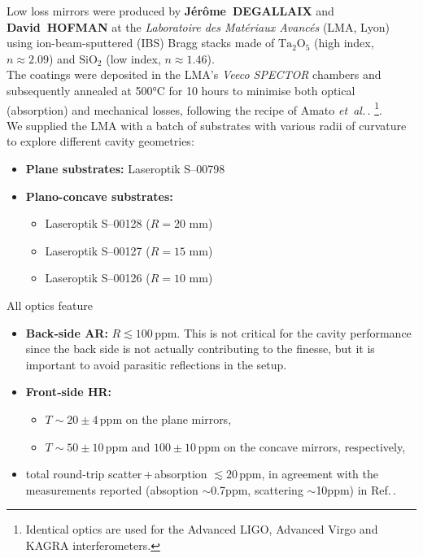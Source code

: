 Low loss mirrors were produced by \textbf{Jérôme~DEGALLAIX} and \textbf{David~HOFMAN} at the
\textit{Laboratoire des Matériaux Avancés} (LMA, Lyon) using
ion-beam-sputtered (IBS) Bragg stacks made of $\mathrm{Ta_2O_5}$ (high index,
$n\!\approx\!2.09$) and $\mathrm{SiO_2}$ (low index, $n\!\approx\!1.46$)\cite{AmatoPhD,LMA_IBS}. \\
The coatings were deposited in the LMA's \textit{Veeco SPECTOR} chambers and subsequently annealed at 500°C for 10 hours to minimise both optical (absorption) and mechanical losses, following the recipe of Amato \textit{et~al.}\,\cite{AmatoPhD}.
\footnote{Identical optics are used for the Advanced LIGO, Advanced Virgo
and KAGRA interferometers\cite{LIGO_optics}.}.\\

We supplied the LMA with a batch of substrates with various radii of curvature to explore different cavity geometries:
\begin{itemize}
  \item \textbf{Plane substrates:} Laseroptik S--00798
  \item \textbf{Plano-concave substrates:}
    \begin{itemize}
        \item Laseroptik S--00128 ($R = 20$ mm)
        \item Laseroptik S--00127 ($R = 15$ mm)
        \item Laseroptik S--00126 ($R = 10$ mm)
    \end{itemize}
\end{itemize}

All optics feature
\begin{itemize}
  \item \textbf{Back‐side AR:} $R \lesssim 100\,$ppm. This is not critical for the cavity performance since the back side is not actually contributing to the finesse, but it is important to avoid parasitic reflections in the setup.
  \item \textbf{Front‐side HR:}
    \begin{itemize}
        \item[] $T \sim 20 \pm 4\,$ppm on the plane mirrors,
        \item[] $T \sim 50 \pm 10\,$ppm and $100 \pm 10\,$ppm on the
                concave mirrors, respectively,
    \end{itemize}
  \item total round‐trip scatter\,+\,absorption
        $\lesssim 20\,$ppm, in agreement with the measurements reported (absoption $\sim$0.7ppm, scattering $\sim$10ppm)
        in Ref.\,\cite{AmatoPhD}.
\end{itemize}

